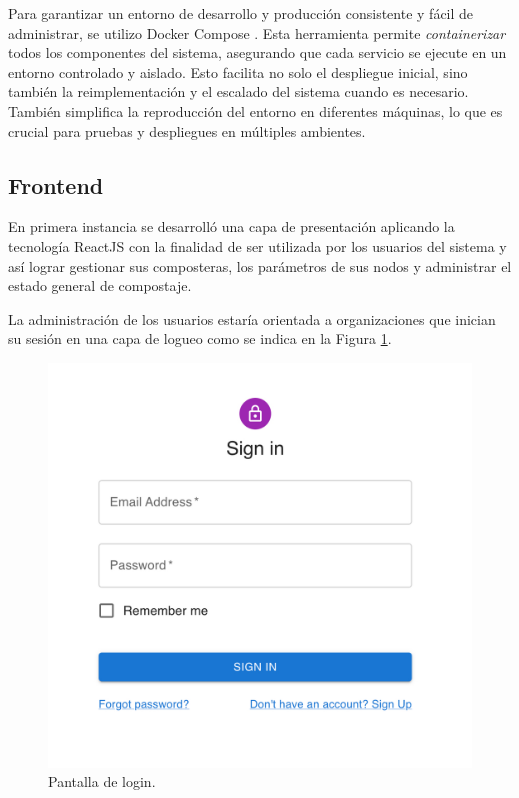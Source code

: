 Para garantizar un entorno de desarrollo y producción consistente y fácil de administrar, se utilizo Docker Compose \citep{DockerCompose}. Esta herramienta permite \textit{containerizar} todos los componentes del sistema, asegurando que cada servicio se ejecute en un entorno controlado y aislado. Esto facilita no solo el despliegue inicial, sino también la reimplementación y el escalado del sistema cuando es necesario. También simplifica la reproducción del entorno en diferentes máquinas, lo que es crucial para pruebas y despliegues en múltiples ambientes.

\subsection{Frontend}

En primera instancia se desarrolló una capa de presentación aplicando la tecnología ReactJS con la finalidad de ser utilizada por los usuarios del sistema y así lograr gestionar sus composteras, los parámetros de sus nodos y administrar el estado general de compostaje. 

La administración de los usuarios estaría orientada a organizaciones que inician su sesión en una capa de logueo como se indica en la Figura \ref{fig:login}. 

\begin{figure}[H]
	\centering
	\includegraphics[scale=.2]{./Figures/PortalWeb/Login.jpeg}
	\caption{Pantalla de login.}
	\label{fig:login}
\end{figure}

